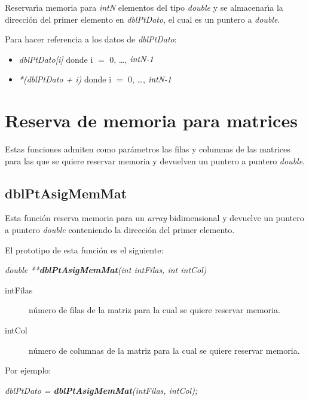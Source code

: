 Reservar\'{\i}a memoria para \emph{intN} elementos del tipo \emph{double} y se
almacenar\'{\i}a la direcci\'on del primer elemento en \emph{dblPtDato}, el cual
es un puntero a \emph{double}.\newline

Para hacer referencia a los datos de \emph{dblPtDato}:

\begin{itemize}
\item \emph{dblPtDato[i]} donde i $=$ 0, \ldots , $\emph{intN-1}$
\item \emph{*(dblPtDato + i)} donde i $=$ 0, \ldots, $\emph{intN-1}$
\end{itemize}

\newpage

\section{Reserva de memoria para matrices}
Estas funciones admiten como par\'ametros las filas y columnas de las matrices
para las que se quiere reservar memoria y devuelven un puntero a puntero 
\emph{double}.

\subsection{dblPtAsigMemMat} \label{sec:asigmemmat}
Esta funci\'on reserva memoria para un \emph{array} bidimensional y 
devuelve un puntero a puntero \emph{double} conteniendo la direcci\'on
del primer elemento.\newline

El prototipo de esta funci\'on es el siguiente:

\begin{center}
\emph{double **\textbf{dblPtAsigMemMat}(int intFilas, int intCol)}
\end{center}

\begin{description}
\item[intFilas] n\'umero de filas de la matriz para la cual se quiere reservar
memoria.
\item[intCol] n\'umero de columnas de la matriz para la cual se quiere reservar
memoria.
\end{description}

Por ejemplo:

\begin{center}
\emph{dblPtDato = \textbf{dblPtAsigMemMat}(intFilas, intCol);}
\end{center}

